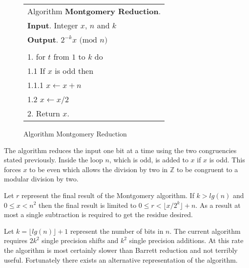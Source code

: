 \documentclass[b5paper]{book}
\def\Z{{\mathbb Z}}
\begin{document}
\newpage\begin{figure}[!here]
\begin{small}
\begin{center}
\begin{tabular}{l}
\hline Algorithm \textbf{Montgomery Reduction}. \\
\textbf{Input}.   Integer $x$, $n$ and $k$ \\
\textbf{Output}.  $2^{-k}x \mbox{ (mod }n\mbox{)}$ \\
\hline \\
1.  for $t$ from $1$ to $k$ do \\
\hspace{3mm}1.1  If $x$ is odd then \\
\hspace{6mm}1.1.1  $x \leftarrow x + n$ \\
\hspace{3mm}1.2  $x \leftarrow x/2$ \\
2.  Return $x$. \\
\hline
\end{tabular}
\end{center}
\end{small}
\caption{Algorithm Montgomery Reduction}
\end{figure}

The algorithm reduces the input one bit at a time using the two congruencies stated previously.  Inside the loop $n$, which is odd, is
added to $x$ if $x$ is odd.  This forces $x$ to be even which allows the division by two in $\Z$ to be congruent to a modular division by two. 

Let $r$ represent the final result of the Montgomery algorithm.  If $k > lg(n)$ and $0 \le x < n^2$ then the final result is limited to 
$0 \le r < \lfloor x/2^k \rfloor + n$.  As a result at most a single subtraction is required to get the residue desired.

Let $k = \lfloor lg(n) \rfloor + 1$ represent the number of bits in $n$.  The current algorithm requires $2k^2$ single precision shifts
and $k^2$ single precision additions.  At this rate the algorithm is most certainly slower than Barrett reduction and not terribly useful.  
Fortunately there exists an alternative representation of the algorithm.
\end{document}
